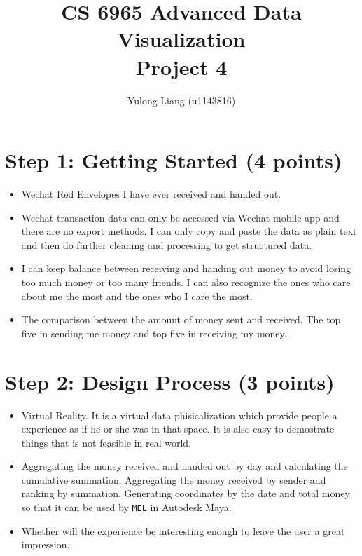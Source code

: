 \documentclass[12pt]{article}
\begin{document}
\title{CS 6965 Advanced Data Visualization\\{\bf Project 4}}
\author{Yulong Liang (u1143816)}
\maketitle

\section*{Step 1: Getting Started (4 points)}
\begin{itemize}
\item Wechat Red Envelopes I have ever received and handed out.
\item Wechat transaction data can only be accessed via Wechat mobile app and there are no export methods. I can only copy and paste the data as plain text and then do further cleaning and processing to get structured data.
\item I can keep balance between receiving and handing out money to avoid losing too much money or too many friends. I can also recognize the ones who care about me the most and the ones who I care the most.
\item The comparison between the amount of money sent and received. The top five in sending me money and top five in receiving my money.
\end{itemize}

\section*{Step 2: Design Process (3 points)}
\begin{itemize}
\item Virtual Reality. It is a virtual data phisicalization which provide people a experience as if he or she was in that space. It is also easy to demostrate things that is not feasible in real world.
\item Aggregating the money received and handed out by day and calculating the cumulative summation. Aggregating the money received by sender and ranking by summation. Generating coordinates by the date and total money so that it can be used by \texttt{MEL} in Autodesk Maya.
\item Whether will the experience be interesting enough to leave the user a great impression.
\end{itemize}
\end{document}
